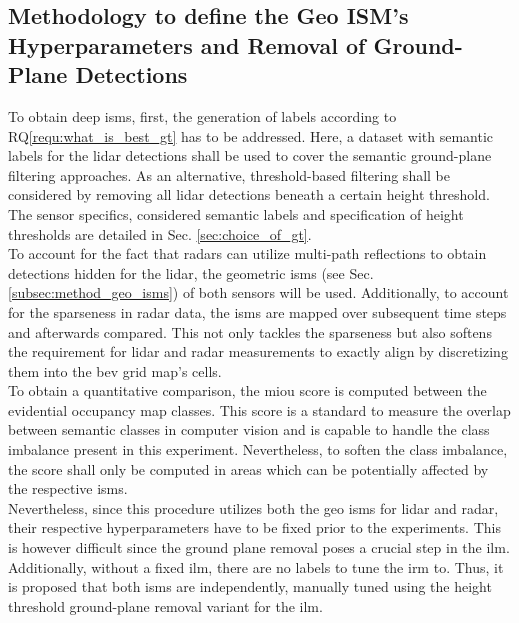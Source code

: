 \subsection{Methodology to define the Geo ISM's Hyperparameters and Removal of Ground-Plane Detections}
\label{subsec:method_choice_of_gt}
To obtain deep \gls{ism}s, first, the generation of labels according to RQ\ref{requ:what_is_best_gt} has to be addressed. Here, a dataset with semantic labels for the lidar detections shall be used to cover the semantic ground-plane filtering approaches. As an alternative, threshold-based filtering shall be considered by removing all lidar detections beneath a certain height threshold. The sensor specifics, considered semantic labels and specification of height thresholds are detailed in Sec. \ref{sec:choice_of_gt}.
\\
To account for the fact that radars can utilize multi-path reflections to obtain detections hidden for the lidar, the geometric \gls{ism}s (see Sec. \ref{subsec:method_geo_isms}) of both sensors will be used. Additionally, to account for the sparseness in radar data, the \gls{ism}s are mapped over subsequent time steps and afterwards compared. This not only tackles the sparseness but also softens the requirement for lidar and radar measurements to exactly align by discretizing them into the \gls{bev} grid map's cells. 
\\
To obtain a quantitative comparison, the m\gls{iou} score is computed between the evidential occupancy map classes. This score is a standard to measure the overlap between semantic classes in computer vision and is capable to handle the class imbalance present in this experiment. Nevertheless, to soften the class imbalance, the score shall only be computed in areas which can be potentially affected by the respective \gls{ism}s.
\\
Nevertheless, since this procedure utilizes both the geo \gls{ism}s for lidar and radar, their respective hyperparameters have to be fixed prior to the experiments. This is however difficult since the ground plane removal poses a crucial step in the \gls{ilm}. Additionally, without a fixed \gls{ilm}, there are no labels to tune the \gls{irm} to. Thus, it is proposed that both \gls{ism}s are independently, manually tuned using the height threshold ground-plane removal variant for the \gls{ilm}. 
%

